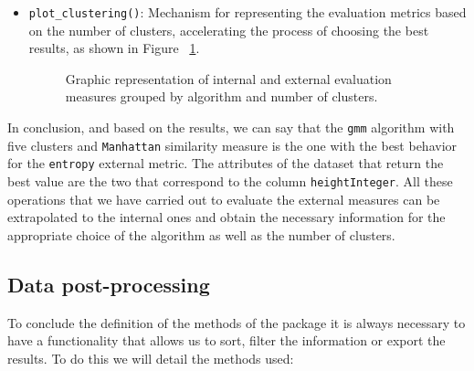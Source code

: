 \begin{itemize}
\item \texttt{plot\_clustering()}: Mechanism for representing the evaluation metrics based on the number of clusters, accelerating the process of choosing the best results, as shown in Figure ~\ref{fig:clustering}.

\begin{figure}[htbp]
  \centering
    \qquad
    \caption{Graphic representation of internal and external evaluation measures grouped by algorithm and number of clusters.}%
    \label{fig:clustering}%
\end{figure}

\end{itemize}
In conclusion, and based on the results, we can say that the \texttt{gmm} algorithm with five clusters and \texttt{Manhattan} similarity measure is the one with the best behavior for the \texttt{entropy} external metric. The attributes of the dataset that return the best value are the two that correspond to the column \texttt{heightInteger}.
All these operations that we have carried out to evaluate the external measures can be extrapolated to the internal ones and obtain the necessary information for the appropriate choice of the algorithm as well as the number of clusters.\\

\subsection {Data post-processing}

To conclude the definition of the methods of the package it is always necessary to have a functionality that allows us to sort, filter the information or export the results. To do this we will detail the methods used:

